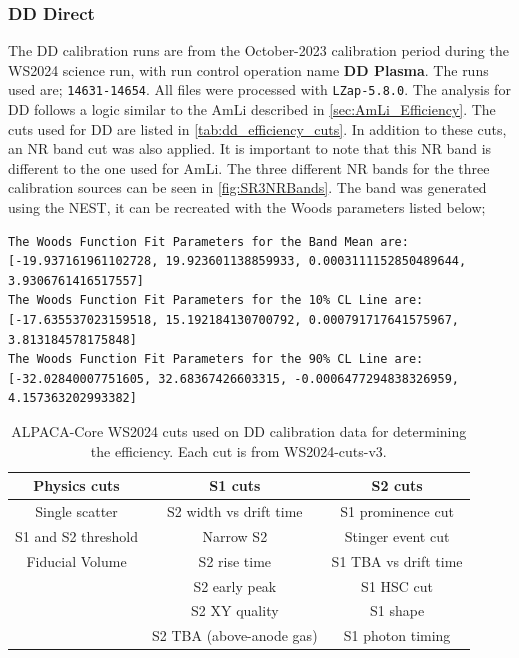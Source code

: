 \subsubsection{DD Direct}
The DD calibration runs are from the October-2023 calibration period during the WS2024 science run, with run control operation name \textbf{DD Plasma}.
The runs used are; \lstinline{14631-14654}.
All files were processed with \lstinline{LZap-5.8.0}.
The analysis for DD follows a logic similar to the AmLi described in \autoref{sec:AmLi_Efficiency}.
The cuts used for DD are listed in \autoref{tab:dd_efficiency_cuts}.
In addition to these cuts, an NR band cut was also applied.
It is important to note that this NR band is different to the one used for AmLi. The three different NR bands for the three calibration sources can be seen in \autoref{fig:SR3NRBands}.
The band was generated using the NEST, it can be recreated with the Woods parameters listed below;
\begin{lstlisting}
The Woods Function Fit Parameters for the Band Mean are:  [-19.937161961102728, 19.923601138859933, 0.0003111152850489644, 3.9306761416517557]
The Woods Function Fit Parameters for the 10% CL Line are:  [-17.635537023159518, 15.192184130700792, 0.000791717641575967, 3.813184578175848]
The Woods Function Fit Parameters for the 90% CL Line are:  [-32.02840007751605, 32.68367426603315, -0.0006477294838326959, 4.157363202993382]
\end{lstlisting}
\begin{table}
	\centering
	\begin{tabular}{c|c|c}
		Physics cuts        & S1 cuts                  & S2 cuts              \\
		\hline
		Single scatter      & S2 width vs drift time   & S1 prominence cut    \\
		S1 and S2 threshold & Narrow S2                & Stinger event cut    \\
		Fiducial Volume     & S2 rise time             & S1 TBA vs drift time \\
		                    & S2 early peak            & S1 HSC cut           \\
		                    & S2 XY quality            & S1 shape             \\
		                    & S2 TBA (above-anode gas) & S1 photon timing     \\
	\end{tabular}
	\caption{ALPACA-Core WS2024 cuts used on DD calibration data for determining the efficiency.
		Each cut is from WS2024-cuts-v3.
	}
	\label{tab:dd_efficiency_cuts}
\end{table}
